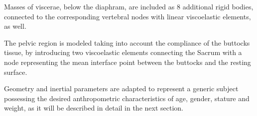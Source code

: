 Masses of viscerae, below the diaphram, are included as 8 additional rigid
bodies, connected to the corresponding vertebral nodes with linear viscoelastic
elements, as well.

The pelvic region is modeled taking into account the compliance of the buttocks
tissue, by introducing two viscoelastic elements connecting the Sacrum with a
node representing the mean interface point between the buttocks and the resting
surface.

Geometry and inertial parameters are adapted to represent a generic subject possessing
the desired anthropometric characteristics of age, gender, stature and weight,
as it will be described in detail in the next section.

